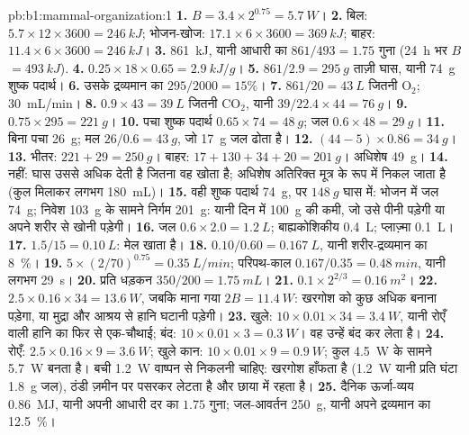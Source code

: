 \begin{solution}{pb:b1:mammal-organization:1}
\textbf{1.} $B = 3.4\times 2^{0.75} = \qty{5.7}{W}$।
\textbf{2.} बिल: $5.7\times 12\times 3600 = \qty{246}{kJ}$;
भोजन-खोज: $17.1\times 6\times 3600 = \qty{369}{kJ}$; बाहर:
$11.4\times 6\times 3600 = \qty{246}{kJ}$।
\textbf{3.} \qty{861}{kJ}, यानी आधारी का $861/493 = 1.75$ गुना
(\qty{24}{h} भर $B$ $= \qty{493}{kJ}$).
\textbf{4.} $0.25\times 18\times 0.65 = \qty{2.9}{kJ/g}$।
\textbf{5.} $861/2.9 = \qty{295}{g}$ ताज़ी घास, यानी \qty{74}{g}
शुष्क पदार्थ।
\textbf{6.} उसके द्रव्यमान का $295/2000 = 15\%$।
\textbf{7.} $861/20 = \qty{43}{L}$ जितनी $\mathrm{O_2}$; \qty{30}{mL/min}।
\textbf{8.} $0.9\times 43 = \qty{39}{L}$ जितनी $\mathrm{CO_2}$, यानी $39/22.4\times 44 = \qty{76}{g}$।
\textbf{9.} $0.75\times 295 = \qty{221}{g}$।
\textbf{10.} पचा शुष्क पदार्थ $0.65\times 74 = \qty{48}{g}$; जल
$0.6\times 48 = \qty{29}{g}$।
\textbf{11.} बिना पचा \qty{26}{g}; मल $26/0.6 = \qty{43}{g}$,
जो \qty{17}{g} जल ढोता है।
\textbf{12.} $(44 - 5)\times 0.86 = \qty{34}{g}$।
\textbf{13.} भीतर: $221 + 29 = \qty{250}{g}$। बाहर: $17 + 130 + 34 + 20
= \qty{201}{g}$। अधिशेष \qty{49}{g}।
\textbf{14.} नहीं: घास उससे अधिक देती है जितना वह खोता है; अधिशेष
अतिरिक्त मूत्र के रूप में निकल जाता है (कुल मिलाकर लगभग \qty{180}{mL})।
\textbf{15.} वही शुष्क पदार्थ \qty{74}{g}, पर $\qty{148}{g}$ घास में:
भोजन में जल \qty{74}{g}; निवेश \qty{103}{g} के सामने निर्गम
\qty{201}{g}: यानी दिन में \qty{100}{g} की कमी, जो उसे पीनी पड़ेगी या
अपने शरीर से खोनी पड़ेगी।
\textbf{16.} जल $0.6\times 2.0 = \qty{1.2}{L}$; बाह्यकोशिकीय
\qty{0.4}{L}; प्लाज़्मा \qty{0.1}{L}।
\textbf{17.} $1.5/15 = \qty{0.10}{L}$: मेल खाता है।
\textbf{18.} $0.10/0.60 = \qty{0.167}{L}$, यानी शरीर-द्रव्यमान का \qty{8}{\%}।
\textbf{19.} $5\times(2/70)^{0.75} = \qty{0.35}{L/min}$; परिपथ-काल
$0.167/0.35 = \qty{0.48}{min}$, यानी लगभग \qty{29}{s}।
\textbf{20.} प्रति धड़कन $350/200 = \qty{1.75}{mL}$।
\textbf{21.} $0.1\times 2^{2/3} = \qty{0.16}{m^2}$।
\textbf{22.} $2.5\times 0.16\times 34 = \qty{13.6}{W}$, जबकि माना गया
$2B = \qty{11.4}{W}$: खरगोश को कुछ अधिक बनाना पड़ेगा, या मुद्रा और आश्रय
से हानि घटानी पड़ेगी।
\textbf{23.} खुले: $10\times 0.01\times 34 = \qty{3.4}{W}$, यानी रोएँ
वाली हानि का फिर से एक-चौथाई; बंद: $10\times 0.01\times 3 =
\qty{0.3}{W}$। वह उन्हें बंद कर लेता है।
\textbf{24.} रोएँ: $2.5\times 0.16\times 9 = \qty{3.6}{W}$; खुले कान:
$10\times 0.01\times 9 = \qty{0.9}{W}$; कुल \qty{4.5}{W} के सामने
\qty{5.7}{W} बनता है। बची \qty{1.2}{W} वाष्पन से निकलनी चाहिए: खरगोश
हाँफता है (\qty{1.2}{W} यानी प्रति घंटा \qty{1.8}{g} जल), ठंडी ज़मीन पर
पसरकर लेटता है और छाया में रहता है।
\textbf{25.} दैनिक ऊर्जा-व्यय \qty{0.86}{MJ}, यानी अपनी आधारी दर का
$1.75$ गुना; जल-आवर्तन \qty{250}{g}, यानी अपने द्रव्यमान का \qty{12.5}{\%}।
\end{solution}
